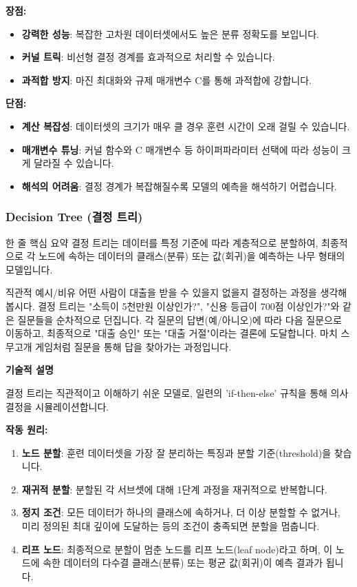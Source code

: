 \documentclass[11pt,a4paper]{article}
\begin{document}
\textbf{장점:}
\begin{itemize}
    \item \textbf{강력한 성능}: 복잡한 고차원 데이터셋에서도 높은 분류 정확도를 보입니다.
    \item \textbf{커널 트릭}: 비선형 결정 경계를 효과적으로 처리할 수 있습니다.
    \item \textbf{과적합 방지}: 마진 최대화와 규제 매개변수 C를 통해 과적합에 강합니다.
\end{itemize}

\textbf{단점:}
\begin{itemize}
    \item \textbf{계산 복잡성}: 데이터셋의 크기가 매우 클 경우 훈련 시간이 오래 걸릴 수 있습니다.
    \item \textbf{매개변수 튜닝}: 커널 함수와 C 매개변수 등 하이퍼파라미터 선택에 따라 성능이 크게 달라질 수 있습니다.
    \item \textbf{해석의 어려움}: 결정 경계가 복잡해질수록 모델의 예측을 해석하기 어렵습니다.
\end{itemize}

\subsubsection{Decision Tree (결정 트리)}

\begin{summarybox}{한 줄 핵심 요약}
결정 트리는 데이터를 특정 기준에 따라 계층적으로 분할하여, 최종적으로 각 노드에 속하는 데이터의 클래스(분류) 또는 값(회귀)을 예측하는 나무 형태의 모델입니다.
\end{summarybox}

\begin{examplebox}{직관적 예시/비유}
어떤 사람이 대출을 받을 수 있을지 없을지 결정하는 과정을 생각해 봅시다. 결정 트리는 "소득이 5천만원 이상인가?", "신용 등급이 700점 이상인가?"와 같은 질문들을 순차적으로 던집니다. 각 질문의 답변(예/아니오)에 따라 다음 질문으로 이동하고, 최종적으로 "대출 승인" 또는 "대출 거절"이라는 결론에 도달합니다. 마치 스무고개 게임처럼 질문을 통해 답을 찾아가는 과정입니다.
\end{examplebox}

\textbf{기술적 설명}

결정 트리는 직관적이고 이해하기 쉬운 모델로, 일련의 'if-then-else' 규칙을 통해 의사결정을 시뮬레이션합니다.

\textbf{작동 원리:}
\begin{enumerate}
    \item \textbf{노드 분할}: 훈련 데이터셋을 가장 잘 분리하는 특징과 분할 기준(threshold)을 찾습니다.
    \item \textbf{재귀적 분할}: 분할된 각 서브셋에 대해 1단계 과정을 재귀적으로 반복합니다.
    \item \textbf{정지 조건}: 모든 데이터가 하나의 클래스에 속하거나, 더 이상 분할할 수 없거나, 미리 정의된 최대 깊이에 도달하는 등의 조건이 충족되면 분할을 멈춥니다.
    \item \textbf{리프 노드}: 최종적으로 분할이 멈춘 노드를 리프 노드(leaf node)라고 하며, 이 노드에 속한 데이터의 다수결 클래스(분류) 또는 평균 값(회귀)이 예측 결과가 됩니다.
\end{enumerate}
\end{document}
